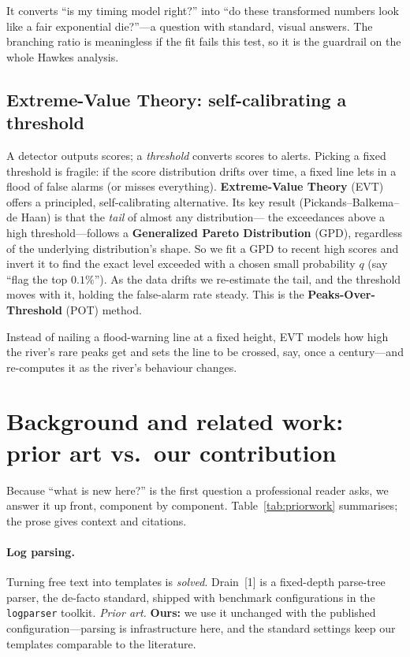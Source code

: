 \documentclass[11pt,a4paper]{article}
\newcommand{\keyword}[1]{\textbf{\color{accent}#1}}
\newcommand{\ours}[1]{{\color{good}\textbf{#1}}}
\newcommand{\code}[1]{\texttt{\small #1}}
\begin{document}
\begin{intuition}
It converts ``is my timing model right?'' into ``do these transformed numbers
look like a fair exponential die?''---a question with standard, visual answers.
The branching ratio is meaningless if the fit fails this test, so it is the
guardrail on the whole Hawkes analysis.
\end{intuition}

\subsection{Extreme-Value Theory: self-calibrating a threshold}
\label{sec:primer-evt}
A detector outputs scores; a \emph{threshold} converts scores to alerts. Picking
a fixed threshold is fragile: if the score distribution drifts over time, a fixed
line lets in a flood of false alarms (or misses everything). \keyword{Extreme-Value
Theory} (EVT) offers a principled, self-calibrating alternative. Its key result
(Pickands--Balkema--de Haan) is that the \emph{tail} of almost any distribution---
the exceedances above a high threshold---follows a \keyword{Generalized Pareto
Distribution} (GPD), regardless of the underlying distribution's shape. So we fit
a GPD to recent high scores and invert it to find the exact level exceeded with a
chosen small probability $q$ (say ``flag the top $0.1\%$''). As the data drifts we
re-estimate the tail, and the threshold moves with it, holding the false-alarm
rate steady. This is the \keyword{Peaks-Over-Threshold} (POT) method.

\begin{intuition}
Instead of nailing a flood-warning line at a fixed height, EVT models how high
the river's rare peaks get and sets the line to be crossed, say, once a
century---and re-computes it as the river's behaviour changes.
\end{intuition}

\section{Background and related work: prior art vs.\ our contribution}
\label{sec:related}

Because ``what is new here?'' is the first question a professional reader asks,
we answer it up front, component by component. Table~\ref{tab:priorwork}
summarises; the prose gives context and citations.

\paragraph{Log parsing.} Turning free text into templates is \emph{solved}.
Drain~[1] is a fixed-depth parse-tree parser, the de-facto standard, shipped with
benchmark configurations in the \code{logparser} toolkit. \emph{Prior art.}
\ours{Ours:} we use it unchanged with the published configuration---parsing is
infrastructure here, and the standard settings keep our templates comparable to
the literature.
\end{document}
